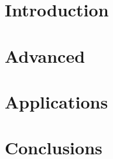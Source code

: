 \section[Intro]{Introduction}


\section[Adv]{Advanced}


\section[App]{Applications}


\section[Concl]{Conclusions}
